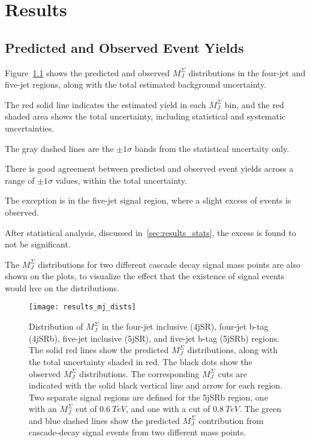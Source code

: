 \chapter{Results} \label{ch:results}

\section{Predicted and Observed Event Yields}\label{sec:results_yields}

Figure~\ref{fig:results_mj_dists} shows the predicted and observed $M_J^{\Sigma}$ distributions in the
four-jet and five-jet regions, along with the total estimated background uncertainty.

The red solid line indicates the estimated yield in each $M_J^{\Sigma}$ bin, and the red shaded area
shows the total uncertainty, including statistical and systematic uncertainties.

The gray dashed lines are the $\pm1\sigma$ bands from the statistical uncertaity only.

There is good agreement between predicted and observed event yields across a range of $\pm1\sigma$ values,
within the total uncertainty.

The exception is in the five-jet signal region, where a slight excess of events is observed.

After statistical analysis, discussed in~\ref{sec:results_stats}, the excess is found to not be significant.

The $M_J^{\Sigma}$ distributions for two different cascade decay signal mass points are also shown on the plots,
to visualize the effect that the existence of signal events would hve on the distributions.


\begin{figure}[!ht]
    \centering
\texttt{[image: results\_mj\_dists]}
\caption{Distribution of $M_J^{\Sigma}$ in the four-jet inclusive (4jSR), four-jet b-tag (4jSRb), five-jet inclusive
(5jSR), and five-jet b-tag (5jSRb) regions.
The solid red lines show the predicted $M_J^{\Sigma}$ distributions, along with the total uncertainty shaded in red.
The black dots show the observed $M_J^{\Sigma}$ distributions.
The corresponding $M_J^{\Sigma}$ cuts are indicated with the solid black vertical line and arrow for each region.
Two separate signal regions are defined for the 5jSRb region, one with an $M_J^{\Sigma}$ cut of $0.6~TeV$,
and one with a cut of $0.8~TeV$.
The green and blue dashed lines show the predicted $M_J^{\Sigma}$ contribution from cascade-decay signal events
from two different mass points.
}
\label{fig:results_mj_dists}
\end{figure}

